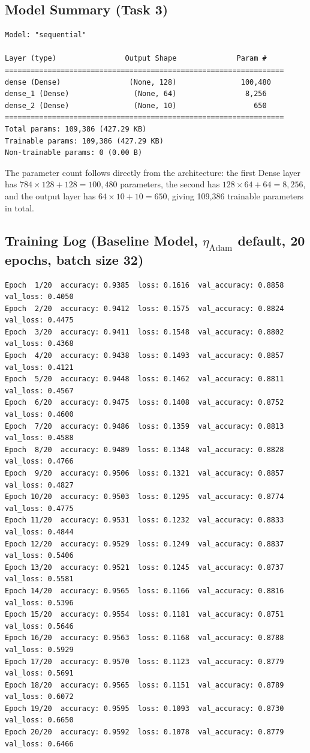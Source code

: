 \documentclass[11pt]{article}
\begin{document}
\subsection{Model Summary (Task 3)}
\begin{verbatim}
Model: "sequential"

Layer (type)                Output Shape              Param #
=================================================================
dense (Dense)                (None, 128)               100,480
dense_1 (Dense)               (None, 64)                8,256
dense_2 (Dense)               (None, 10)                  650
=================================================================
Total params: 109,386 (427.29 KB)
Trainable params: 109,386 (427.29 KB)
Non-trainable params: 0 (0.00 B)
\end{verbatim}

The parameter count follows directly from the architecture: the first Dense layer has $784 \times 128 + 128 = 100{,}480$ parameters, the second has $128 \times 64 + 64 = 8{,}256$, and the output layer has $64 \times 10 + 10 = 650$, giving 109,386 trainable parameters in total.

\subsection{Training Log (Baseline Model, $\eta_{\text{Adam}}$ default, 20 epochs, batch size 32)}
\begin{verbatim}
Epoch  1/20  accuracy: 0.9385  loss: 0.1616  val_accuracy: 0.8858  val_loss: 0.4050
Epoch  2/20  accuracy: 0.9412  loss: 0.1575  val_accuracy: 0.8824  val_loss: 0.4475
Epoch  3/20  accuracy: 0.9411  loss: 0.1548  val_accuracy: 0.8802  val_loss: 0.4368
Epoch  4/20  accuracy: 0.9438  loss: 0.1493  val_accuracy: 0.8857  val_loss: 0.4121
Epoch  5/20  accuracy: 0.9448  loss: 0.1462  val_accuracy: 0.8811  val_loss: 0.4567
Epoch  6/20  accuracy: 0.9475  loss: 0.1408  val_accuracy: 0.8752  val_loss: 0.4600
Epoch  7/20  accuracy: 0.9486  loss: 0.1359  val_accuracy: 0.8813  val_loss: 0.4588
Epoch  8/20  accuracy: 0.9489  loss: 0.1348  val_accuracy: 0.8828  val_loss: 0.4766
Epoch  9/20  accuracy: 0.9506  loss: 0.1321  val_accuracy: 0.8857  val_loss: 0.4827
Epoch 10/20  accuracy: 0.9503  loss: 0.1295  val_accuracy: 0.8774  val_loss: 0.4775
Epoch 11/20  accuracy: 0.9531  loss: 0.1232  val_accuracy: 0.8833  val_loss: 0.4844
Epoch 12/20  accuracy: 0.9529  loss: 0.1249  val_accuracy: 0.8837  val_loss: 0.5406
Epoch 13/20  accuracy: 0.9521  loss: 0.1245  val_accuracy: 0.8737  val_loss: 0.5581
Epoch 14/20  accuracy: 0.9565  loss: 0.1166  val_accuracy: 0.8816  val_loss: 0.5396
Epoch 15/20  accuracy: 0.9554  loss: 0.1181  val_accuracy: 0.8751  val_loss: 0.5646
Epoch 16/20  accuracy: 0.9563  loss: 0.1168  val_accuracy: 0.8788  val_loss: 0.5929
Epoch 17/20  accuracy: 0.9570  loss: 0.1123  val_accuracy: 0.8779  val_loss: 0.5691
Epoch 18/20  accuracy: 0.9565  loss: 0.1151  val_accuracy: 0.8789  val_loss: 0.6072
Epoch 19/20  accuracy: 0.9595  loss: 0.1093  val_accuracy: 0.8730  val_loss: 0.6650
Epoch 20/20  accuracy: 0.9592  loss: 0.1078  val_accuracy: 0.8779  val_loss: 0.6466
\end{verbatim}
\end{document}
